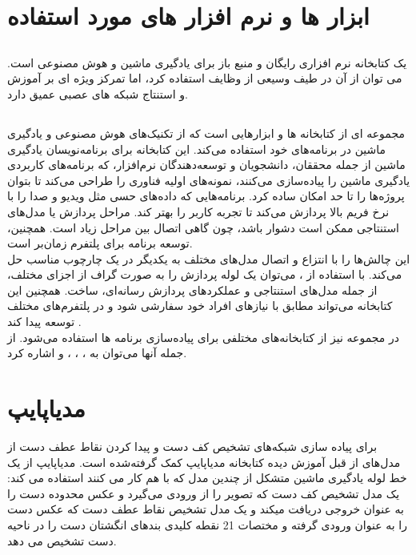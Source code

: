 \section{ابزار ها و نرم افزار های مورد استفاده}
\subsection{}
 یک کتابخانه نرم افزاری رایگان و منبع باز برای یادگیری ماشین و هوش مصنوعی است. می توان از آن در طیف وسیعی از وظایف استفاده کرد، اما تمرکز ویژه ای بر آموزش و استنتاج شبکه های عصبی عمیق دارد.

\subsection{}
 مجموعه ای از کتابخانه ها و ابزارهایی است که از تکنیک‌های هوش مصنوعی و یادگیری ماشین در برنامه‌های خود استفاده می‌کند.
این کتابخانه برای برنامه‌نویسان یادگیری ماشین از جمله محققان، دانشجویان و توسعه‌دهندگان نرم‌افزار، که برنامه‌های کاربردی یادگیری ماشین را پیاده‌سازی می‌کنند، نمونه‌های
اولیه فناوری را طراحی می‌کند تا بتوان پروژه‌ها را تا حد امکان ساده کرد.
برنامه‌هایی که داده‌های حسی مثل ویدیو و صدا را با نرخ فریم بالا پردازش می‌کند تا تجربه کاربر را بهتر کند. مراحل پردازش یا مدل‌های استنتاجی ممکن است دشوار باشد، چون 
گاهی اتصال بین مراحل زیاد است. همچنین، توسعه برنامه برای پلتفرم‌ زمان‌بر است. \cite{lugaresi2019mediapipe}
\\
 این چالش‌ها را با انتزاع و اتصال مدل‌های مختلف به یکدیگر در یک چارچوب مناسب حل می‌کند. با استفاده از ، می‌توان یک لوله پردازش را به صورت 
گراف از اجزای مختلف، از جمله مدل‌های استنتاجی و عملکردهای پردازش رسانه‌ای، ساخت.
همچنین این کتابخانه می‌تواند مطابق با نیازهای افراد خود سفارشی شود و در پلتفرم‌های مختلف توسعه پیدا کند \cite{harris2021applying}.
\\
در مجموعه  نیز از کتابخانه‌های مختلفی برای پیاده‌سازی برنامه ها استفاده می‌شود. از جمله آنها می‌توان به ، ، ،  و  اشاره کرد. \cite{harris2021applying}


\section{مدیاپایپ}
برای پیاده سازی شبکه‌های تشخیص کف دست و پیدا کردن نقاط عطف دست از مدل‌های از قبل آموزش دیده کتابخانه مدیاپایپ کمک گرفته‌شده است. مدیاپایپ  از یک خط لوله
یادگیری ماشین متشکل از چندین مدل که با هم کار می کنند استفاده می کند: یک مدل تشخیص کف دست 
که تصویر را از ورودی می‌گیرد و  عکس محدوده دست را به عنوان خروجی دریافت میکند و یک مدل تشخیص نقاط عطف دست 
که عکس دست را به عنوان ورودی گرفته و مختصات‌ 21 نقطه کلیدی بند‌های انگشتان دست را در ناحیه دست تشخیص می دهد.


